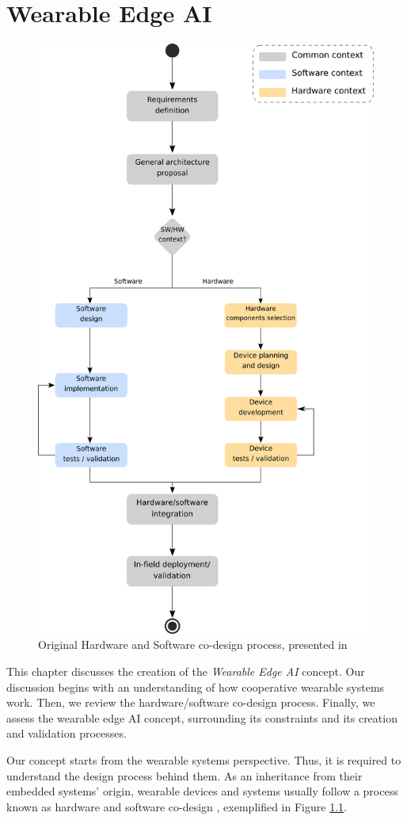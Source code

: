 \chapter{Wearable Edge AI}
\label{chap:wearable-edge-ai}


\begin{figure}[h!]
    \centering
    \includegraphics[width = .5\linewidth]{Figures/design_diagram.png}
    \caption{Original Hardware and Software co-design process, presented in \cite{silva2019field}}
    \label{fig:hw-sw-codesign}
\end{figure}

This chapter discusses the creation of the \textit{Wearable Edge AI} concept. Our discussion begins with an understanding of how cooperative wearable systems work. Then, we review the hardware/software co-design process. Finally, we assess the wearable edge AI concept, surrounding its constraints and its creation and validation processes.

Our concept starts from the wearable systems perspective. Thus, it is required to understand the design process behind them. As an inheritance from their embedded systems' origin, wearable devices and systems usually follow a process known as hardware and software co-design \cite{silva2019field}, exemplified in Figure \ref{fig:hw-sw-codesign}. 

